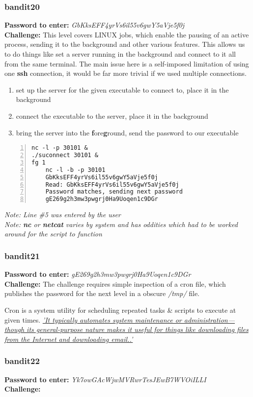 \documentclass[a4paper]{article}
\newcommand{\pass}[1]{\textbf{Password to enter:} \textit{#1}\\}
\newcommand{\chall}{\textbf{Challenge:} }
\begin{document}
\subsubsection{bandit20}
\pass{GbKksEFF4yrVs6il55v6gwY5aVje5f0j}
\chall This level covers LINUX jobs, which enable the pausing of an active process, sending it to the background and other various features. This allows us to do things like set a server running in the background and connect to it all from the same terminal. The main issue here is a self-imposed limitation of using one \textbf{ssh} connection, it would be far more trivial if we used multiple connections.
\begin{enumerate}
	\item set up the server for the given executable to connect to, place it in the background
	\item connect the executable to the server, place it in the background
	\item bring the server into the \textbf{f}ore\textbf{g}round, send the password to our executable
\end{enumerate}
\begin{lstlisting}[numbers=left]
nc -l -p 30101 &
./suconnect 30101 &
fg 1
	nc -l -b -p 30101
	GbKksEFF4yrVs6il55v6gwY5aVje5f0j
	Read: GbKksEFF4yrVs6il55v6gwY5aVje5f0j
	Password matches, sending next password
	gE269g2h3mw3pwgrj0Ha9Uoqen1c9DGr
\end{lstlisting}
\textit{Note: Line \#5 was entered by the user}\\
\textit{Note: \textbf{nc} or \textbf{netcat} varies by system and has oddities which had to be worked around for the script to function}

\subsubsection{bandit21}
\pass{gE269g2h3mw3pwgrj0Ha9Uoqen1c9DGr}
\chall The challenge requires simple inspection of a cron file, which publishes the password for the next level in a obscure \textit{/tmp/} file.

Cron is a system utility for scheduling repeated tasks \& scripts to execute at given times. \href{https://en.wikipedia.org/wiki/Cron}{\textit{'It typically automates system maintenance or administration—though its general-purpose nature makes it useful for things like downloading files from the Internet and downloading email..'}}

\subsubsection{bandit22}
\pass{Yk7owGAcWjwMVRwrTesJEwB7WVOiILLI}
\chall 
\begin{lstlisting}

\end{lstlisting}
\end{document}
